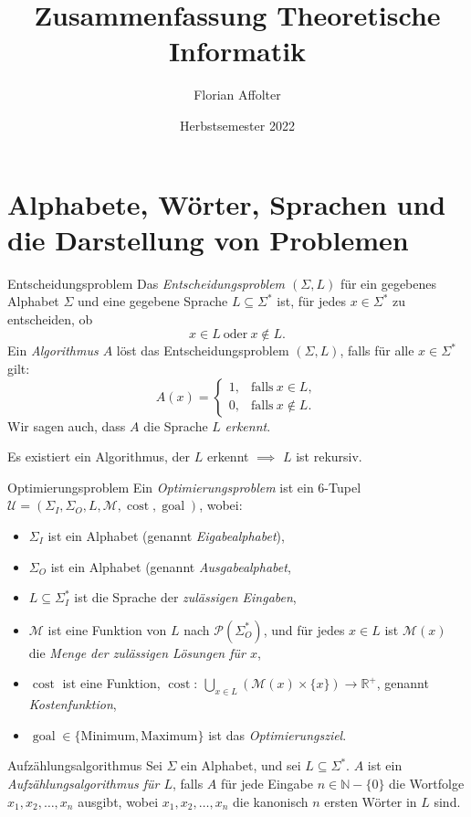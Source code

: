 \documentclass[a4paper,10pt]{article}
\title{Zusammenfassung Theoretische Informatik}
\author{Florian Affolter}
\date{Herbstsemester 2022}
\begin{document}
\maketitle

\section{Alphabete, Wörter, Sprachen und die Darstellung von Problemen}
\begin{mainbox}{Entscheidungsproblem}
Das \emph{Entscheidungsproblem $(\Sigma, L)$} für ein gegebenes Alphabet $\Sigma$ und eine gegebene Sprache $L \subseteq \Sigma^*$ ist, für jedes $x \in \Sigma^*$ zu entscheiden, ob
\[x \in L\ \text{oder}\ x \notin L \text{.}\]
Ein \emph{Algorithmus $A$} löst das Entscheidungsproblem $(\Sigma, L)$, falls für alle $x \in \Sigma^*$ gilt:
\[A(x) =
\begin{cases}
1, &\text{falls}\ x \in L,\\
0, &\text{falls}\ x \notin L \text{.}
\end{cases}
\]
Wir sagen auch, dass $A$ die Sprache $L$ \emph{erkennt}.
\end{mainbox}
Es existiert ein Algorithmus, der $L$ erkennt $\implies$ $L$ ist rekursiv.
\begin{subbox}{Optimierungsproblem}
Ein \emph{Optimierungsproblem} ist ein 6-Tupel $\mathcal{U} = (\Sigma_I, \Sigma_O, L, \mathcal{M}, \operatorname{cost}, \operatorname{goal})$, wobei:
\begin{itemize}
    \item $\Sigma_I$ ist ein Alphabet (genannt \emph{Eigabealphabet}),
    \item $\Sigma_O$ ist ein Alphabet (genannt \emph{Ausgabealphabet},
    \item $L \subseteq \Sigma_I^*$ ist die Sprache der \emph{zulässigen Eingaben},
    \item $\mathcal{M}$ ist eine Funktion von $L$ nach $\mathcal{P}(\Sigma_O^*)$, und für jedes $x \in L$ ist $\mathcal{M}(x)$ die \emph{Menge der zulässigen Lösungen für $x$},
    \item $\operatorname{cost}$ ist eine Funktion, $\operatorname{cost}:\: \bigcup_{x \in L} (\mathcal{M}(x) \times \{x\}) \to \mathbb{R}^+$, genannt \emph{Kostenfunktion},
    \item$\operatorname{goal} \in \{\text{Minimum}, \text{Maximum}\}$ ist das \emph{Optimierungsziel}.
\end{itemize}
\end{subbox}
\begin{subbox}{Aufzählungsalgorithmus}
    Sei $\Sigma$ ein Alphabet, und sei $L \subseteq \Sigma^*$. $A$ ist ein \emph{Aufzählungsalgorithmus für $L$}, falls $A$ für jede Eingabe $n \in \mathbb{N} - \{0\}$ die Wortfolge $x_1, x_2, \dots, x_n$ ausgibt, wobei $x_1, x_2, \dots, x_n$ die kanonisch $n$ ersten Wörter in $L$ sind.
\end{subbox}
\end{document}
